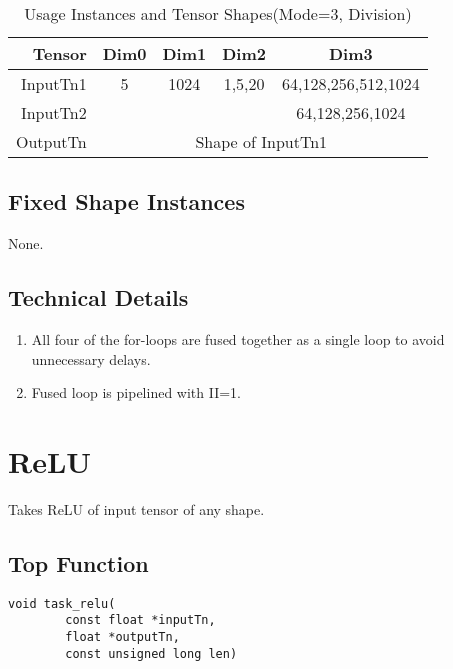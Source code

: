 \documentclass[•]{article}
\begin{document}
\begin{table}[htbp]
\caption{Usage Instances and Tensor Shapes(Mode=3, Division)}
\label{tab:shapes_matops}
	\begin{center}
		\begin{tabular}{|r|c|c|c|c|} 
		\hline	
		Tensor  & Dim0 & Dim1 & Dim2 & Dim3\\ 
		\hline	
		InputTn1 &
			5&
			1024&
			1,5,20&
			64,128,256,512,1024\\
		\hline	
		InputTn2 &
			&
			&
			&
			64,128,256,1024\\	
		\hline
		OutputTn &
			\multicolumn{4}{|c|}{Shape of InputTn1} \\
		\hline
		\end{tabular}
	\end{center}
\end{table}
\vspace{2 cm}
\subsection{Fixed Shape Instances}
None.

\subsection{Technical Details}
\begin{enumerate}
\item All four of the for-loops are fused together as a single loop to avoid unnecessary delays.
\item Fused loop is pipelined with II=1.
\end{enumerate}






\pagebreak





\section{ReLU}
Takes ReLU of input tensor of any shape.

\subsection{Top Function}
\begin{lstlisting}
void task_relu(
		const float *inputTn,
		float *outputTn,
		const unsigned long len)
\end{lstlisting}
\end{document}
